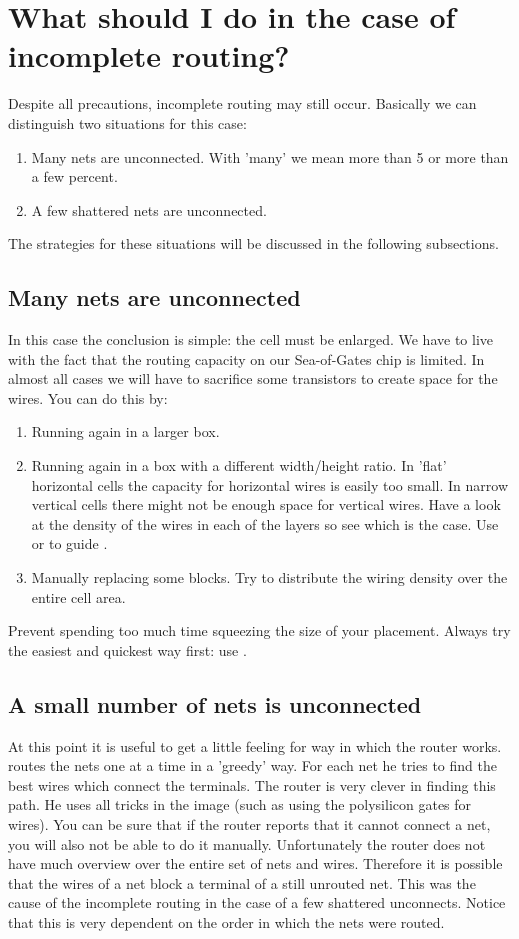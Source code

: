 \section{What should I do in the case of incomplete routing?}
Despite all precautions, incomplete routing may still occur.  
Basically we can
distinguish two situations for this case:
\begin{enumerate}
\item
Many nets are unconnected. With 'many' we mean more than 5
or more than a few percent.
\item
A few shattered nets are unconnected.
\end{enumerate}
The strategies for these situations will be discussed in
the following subsections.

\subsection{Many nets are unconnected}
In this case the conclusion is simple: the cell must be enlarged.  We have to
live with the fact that the routing capacity on our Sea-of-Gates chip is
limited.  In almost all cases we will have to sacrifice some transistors to
create space for the wires. You can do this by:
\begin{enumerate}
\item
Running  again in a larger box. 
\item
Running  again in a box with a different width/height ratio.  In
'flat' horizontal cells the capacity for horizontal wires is easily too small.
In narrow vertical cells there might not be enough space for vertical wires.
Have a look at the density of the wires in each of the layers so see which is
the case. Use
 or  to guide
.
\item
Manually replacing some blocks. Try to distribute the
wiring density over the entire cell area.
\end{enumerate}
Prevent spending too much time squeezing the size of your
placement.  Always try the easiest and quickest way first: use .

\subsection{A small number of nets is unconnected}
At this point it is useful to get a little feeling for way in which the router
works.  routes the nets one at a time in a 'greedy' way.  For each
net he tries to find the best wires which connect the terminals.  The router
is very clever in finding this path.  He uses all tricks in the image (such as
using the polysilicon gates for wires).  You can be sure that if the router
reports that it cannot connect a net, you will also not be able to do it
manually.  Unfortunately the router does not have much overview over the
entire set of nets and wires. Therefore it is possible that the wires of a net
block a terminal of a still unrouted net. This was the cause of the incomplete
routing in the case of a few shattered unconnects.  Notice that this is very
dependent on the order in which the nets were routed. 

